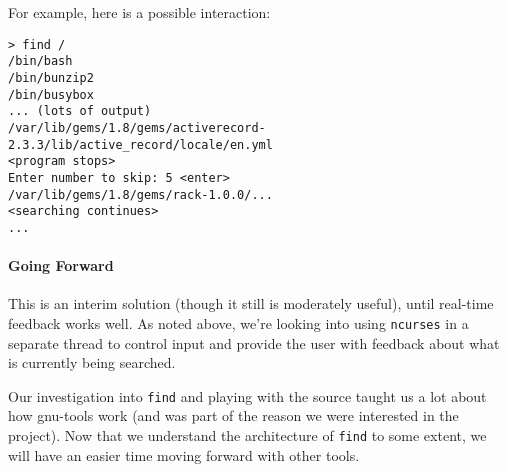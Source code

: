 \documentclass{article}
\begin{document}
For example, here is a possible interaction:

\begin{verbatim}
> find /
/bin/bash
/bin/bunzip2
/bin/busybox
... (lots of output)
/var/lib/gems/1.8/gems/activerecord-2.3.3/lib/active_record/locale/en.yml
<program stops>
Enter number to skip: 5 <enter>
/var/lib/gems/1.8/gems/rack-1.0.0/...
<searching continues>
...
\end{verbatim}

\paragraph{Going Forward}

This is an interim solution (though it still is moderately useful),
until real-time feedback works well.  As noted above, we're looking
into using {\tt ncurses} in a separate thread to control input and
provide the user with feedback about what is currently being searched.

Our investigation into {\tt find} and playing with the source taught
us a lot about how gnu-tools work (and was part of the reason we were
interested in the project).  Now that we understand the architecture
of {\tt find} to some extent, we will have an easier time moving
forward with other tools.
\end{document}
